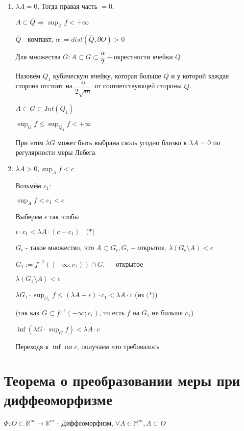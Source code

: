 \documentclass[paper=a4, fontsize=17pt]{article}
\begin{document}
\begin{enumerate}
	\item $\lambda A = 0$. Тогда правая часть $ = 0$.

	$A \subset \overline{Q} \Rightarrow \sup_A f < + \infty$

	$\overline{Q}$ - компакт, $\alpha := dist(\overline{Q}, \partial O) > 0$

	Для множества $G: A \subset G \subset \dfrac{\alpha}{2}-$окрестности ячейки $Q$

	Назовём $Q_1$ кубическую ячейку, которая больше $Q$ и у которой каждая сторона отстоит на $\dfrac{\alpha}{2 \sqrt{m}}$ от соответствующей стороны $Q$.

	$A \subset G \subset Int(Q_1)$

	$\sup_G f \leqslant \sup_{\overline{Q_1}} f < + \infty$

	При этом $\lambda G$ может быть выбрана сколь угодно близко к $\lambda A = 0$ по регулярности меры Лебега.

	\item $\lambda A > 0, \sup_A f < c$

	Возьмём $c_1$:

	$\sup_A f < c_1 < c$

	Выберем $\epsilon$ так чтобы

	$\epsilon \cdot c_1 < \lambda A \cdot (c - c_1) ~~~~ \textbf{(*)}$

	$G_{\epsilon}$ - такое множество, что $A \subset G_{\epsilon}, G_{\epsilon}-$открытое, $\lambda(G_{\epsilon} \setminus A) < \epsilon$

	$G_1 := f^{-1}((- \infty; c_1)) \cap G_{\epsilon} - $ открытое

	$\lambda(G_1 \setminus A) < \epsilon$

	$\lambda G_1 \cdot \sup_{G_1} f \leqslant (\lambda A + \epsilon) \cdot c_1 < \lambda A \cdot c$ (из $\textbf{(*)}$)

	(так как $G \subset f^{-1}(- \infty; c_1)$, то есть $f$ на $G_1$ не больше $c_1$)

	$\inf(\lambda G \cdot \sup_G f) < \lambda A \cdot c$

	Переходя к $\inf$ по $c$, получаем что требовалось
\end{enumerate}

\section{Теорема о преобразовании меры при диффеоморфизме}
$\Phi: O \subset \mathds{R}^m \rightarrow \mathds{R}^m$ - Диффеоморфизм, $\forall A \in \mathds{M}^m, A \subset O$
\end{document}
